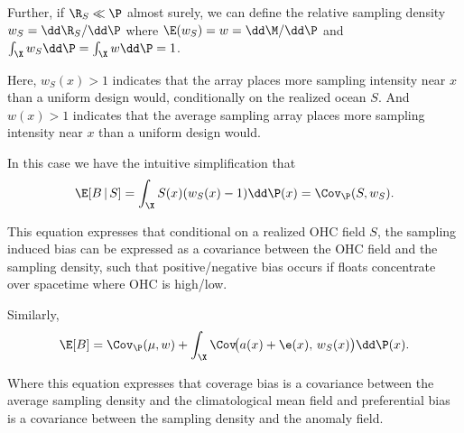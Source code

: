 
Further, if $\R_S \ll \P$ almost surely, we can define the relative sampling density
$w_S = \dd\R_S/\dd\P$ where $\E(w_S) = w = \dd\M/\dd\P$ and $\int_\X w_S \dd\P = \int_\X w \dd\P = 1$.

Here, $w_S(x) > 1$ indicates that the array places more sampling intensity near $x$ than a uniform
design would, conditionally on the realized ocean $S$. And $w(x) > 1$ indicates that the average sampling array places more sampling intensity near $x$ than a uniform
design would.

In this case we have the intuitive simplification that 
\begin{equation}
\E[B\,|\,S] = \int_\X S(x)(w_S(x) - 1)\dd\P(x) = \Cov_{\P}(S, w_S) .
\end{equation}

This equation expresses that conditional on a realized OHC field $S$, the sampling induced bias can be expressed as a covariance between the OHC field and the sampling density, such that positive/negative bias occurs if floats concentrate over spacetime where OHC is high/low.

Similarly,
\begin{equation}
  \E[B] = \Cov_\P(\mu, w) + \int_\X \Cov\!\big(a(x) + \e(x),\, w_S(x)\big)\dd\P(x) .
\end{equation}

Where this equation expresses that coverage bias is a covariance between the average sampling density and the climatological mean field and preferential bias is a covariance between the sampling density and the anomaly field.

